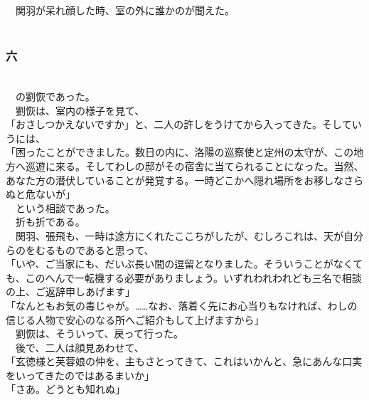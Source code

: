 \documentclass[
  paper=a5,
  fontsize=10pt,
  jafontsize=9.5pt,
  tate,                  %
  open_bracket_pos=nibu, %
]{jlreq}
\begin{document}
　関羽が呆れ顔した時、室の外に誰かのが聞えた。\\

\\

\subsubsection{六}

\\


　の劉恢であった。\\


　劉恢は、室内の様子を見て、\\


「おさしつかえないですか」と、二人の許しをうけてから入ってきた。そしていうには、\\


「困ったことができました。数日の内に、洛陽の巡察使と定州の太守が、この地方へ巡遊に来る。そしてわしの邸がその宿舎に当てられることになった。当然、あなた方の潜伏していることが発覚する。一時どこかへ隠れ場所をお移しなさらぬと危ないが」\\


　という相談であった。\\


　折も折である。\\


　関羽、張飛も、一時は途方にくれたここちがしたが、むしろこれは、天が自分らのをむるものであると思って、\\


「いや、ご当家にも、だいぶ長い間の逗留となりました。そういうことがなくても、このへんで一転機する必要がありましょう。いずれわれわれども三名で相談の上、ご返辞申しあげます」\\


「なんともお気の毒じゃが。……なお、落着く先にお心当りもなければ、わしの信じる人物で安心のなる所へご紹介もして上げますから」\\


　劉恢は、そういって、戻って行った。\\


　後で、二人は顔見あわせて、\\


「玄徳様と芙蓉娘の仲を、主もさとってきて、これはいかんと、急にあんな口実をいってきたのではあるまいか」\\


「さあ。どうとも知れぬ」\\
\end{document}
